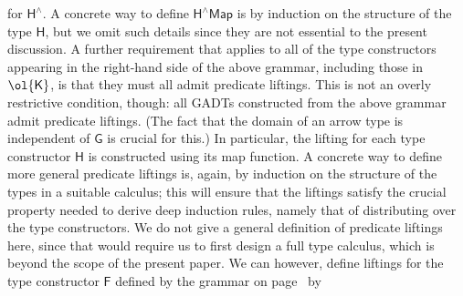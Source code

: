 \documentclass[sigplan,screen]{acmart}
\begin{document}
for $\mathsf{H^{\wedge}}$. A concrete way to define $\mathsf{H^\wedge
  Map}$ is by induction on the structure of the type $\mathsf{H}$, but
we omit such details since they are not essential to the present
discussion. A further requirement that applies to all of the type
constructors appearing in the right-hand side of the above grammar,
including those in $\ol{\mathsf{K}}$, is that they must all admit
predicate liftings. This is not an overly restrictive condition,
though: all
GADTs constructed from the above grammar admit predicate liftings.
(The fact that the domain of an arrow type is independent of
$\mathsf{G}$ is crucial for this.) In particular, the lifting for each
type constructor $\mathsf{H}$ is constructed using its map function.
A concrete way to define more general predicate liftings is, again, by
induction on the structure of the types in a suitable calculus; this
will ensure that the liftings satisfy the crucial property needed to
derive deep induction rules, namely that of distributing over the type
constructors. We do not give a general definition of predicate
liftings here, since that would require us to first design a full type
calculus, which is beyond the scope of the present paper. We can
however, define liftings for the type constructor $\mathsf{F}$ defined
by the grammar on page~\pageref{grammar} by
\end{document}
